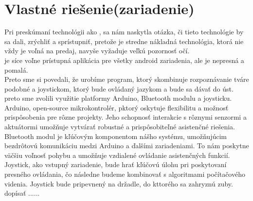 \section{Vlastné riešenie(zariadenie)} %
\tab[5 mm] Pri preskúmaní technológii ako ,  sa nám naskytla otázka, či tieto technológie by sa dali, zrýchliť a sprístupniť, pretože  je stredne nákladná technológia, ktorá nie vždy je voľná na predaj, navyše vyžaduje  veľkú pozornosť očí. %
\\ 
\tab[5 mm]  je síce voľne prístupná aplikácia pre všetky android zariadenia, ale je nepresná a pomalá.\\ 
\tab[5 mm] Preto sme si povedali, že urobíme program, ktorý skombinuje rozpoznávanie tváre podobné  a joystickom, ktorý bude ovládaný jazykom a bude sa dávať do úst.\\ 
\tab[5 mm] preto sme zvolili využitie platformy Arduino, Bluetooth modulu a joysticku. Arduino, open-source mikrokontrolér, pktorý oskytuje flexibilitu a možnosť prispôsobenia pre rôzne projekty. Jeho schopnosť interakcie s rôznymi senzormi a aktuátormi umožňuje vytvárať robustné a prispôsobiteľné asistenčné riešenia.\\ 
\tab[5 mm] Bluetooth modul je kľúčovým komponentom nášho systému, umožňujúcim bezdrôtovú komunikáciu medzi Arduino a ďalšími zariadeniami. To nám poskytne väčšiu voľnosť pohybu a umožňuje vzdialené ovládanie asistenčných funkcií.\\ 
\tab[5 mm] Joystick, ako vstupný zariadenie, bude hrať kľúčovú úlohu pri poskytovaní presného ovládania, čo následne budeme kombinovať s algoritmami počítačového videnia. Joystick bude pripevnený na držadle, do kttorého sa zahryznú zuby. \\ 
\tab[5 mm] dopísať ......